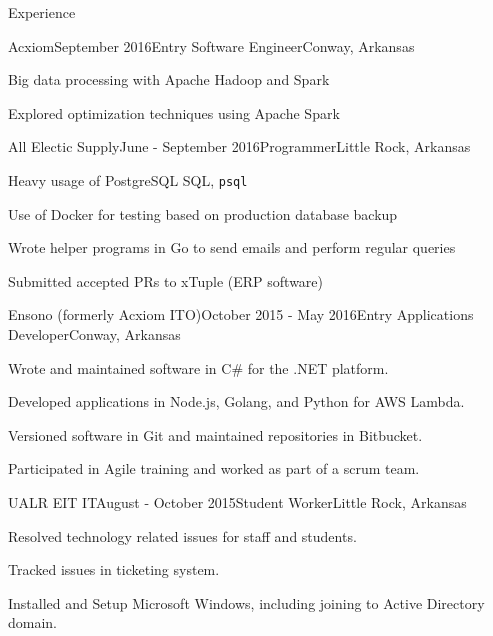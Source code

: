 \documentclass{resume} %
\begin{document}
\begin{rSection}{Experience}

\begin{rSubsection}{Acxiom}{September 2016}{Entry Software Engineer}{Conway, Arkansas}

	\item Big data processing with Apache Hadoop and Spark
	\item Explored optimization techniques using Apache Spark
\end{rSubsection}


\begin{rSubsection}{All Electic Supply}{June - September 2016}{Programmer}{Little Rock, Arkansas}

	\item Heavy usage of PostgreSQL SQL, {\tt psql}
	\item Use of Docker for testing based on production database backup
	\item Wrote helper programs in Go to send emails and perform regular queries
	\item Submitted accepted PRs to xTuple (ERP software)
\end{rSubsection}

\begin{rSubsection}{Ensono (formerly Acxiom ITO)}{October 2015 - May 2016}{Entry Applications Developer}{Conway, Arkansas}

	\item Wrote and maintained software in C\# for the .NET platform.
	\item Developed applications in Node.js, Golang, and Python for AWS Lambda.
	\item Versioned software in Git and maintained repositories in Bitbucket.
	\item Participated in Agile training and worked as part of a scrum team.
\end{rSubsection}

\begin{rSubsection}{UALR EIT IT}{August - October 2015}{Student Worker}{Little Rock, Arkansas}

	\item Resolved technology related issues for staff and students.
	\item Tracked issues in ticketing system.
	\item Installed and Setup Microsoft Windows, including joining to Active Directory domain.
\end{rSubsection}


\end{rSection}
\end{document}
